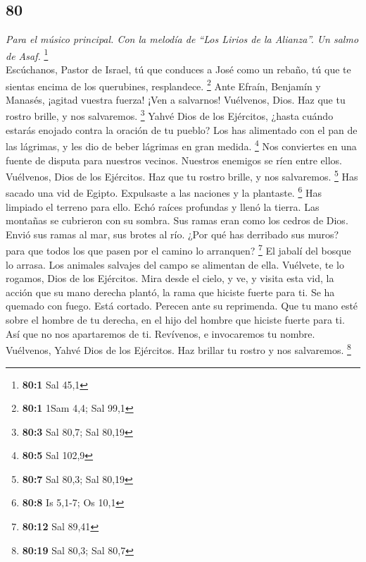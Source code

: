 \begin{paracol}{2}
\hypertarget{section-158}{%
\section{80}\label{section-158}}

\emph{Para el músico principal. Con la melodía de ``Los Lirios de la
Alianza''. Un salmo de Asaf.} \footnote{\textbf{80:1} Sal 45,1}\\
 Escúchanos, Pastor de Israel, tú que conduces a José como
un rebaño, tú que te sientas encima de los querubines, resplandece.
\footnote{\textbf{80:1} 1Sam 4,4; Sal 99,1}  Ante Efraín,
Benjamín y Manasés, ¡agitad vuestra fuerza! ¡Ven a salvarnos!
 Vuélvenos, Dios. Haz que tu rostro brille, y nos
salvaremos. \footnote{\textbf{80:3} Sal 80,7; Sal 80,19} 
Yahvé Dios de los Ejércitos, ¿hasta cuándo estarás enojado contra la
oración de tu pueblo?  Los has alimentado con el pan de
las lágrimas, y les dio de beber lágrimas en gran medida. \footnote{\textbf{80:5}
  Sal 102,9}  Nos conviertes en una fuente de disputa para
nuestros vecinos. Nuestros enemigos se ríen entre ellos. 
Vuélvenos, Dios de los Ejércitos. Haz que tu rostro brille, y nos
salvaremos. \footnote{\textbf{80:7} Sal 80,3; Sal 80,19} 
Has sacado una vid de Egipto. Expulsaste a las naciones y la plantaste.
\footnote{\textbf{80:8} Is 5,1-7; Os 10,1}  Has limpiado
el terreno para ello. Echó raíces profundas y llenó la tierra.
 Las montañas se cubrieron con su sombra. Sus ramas eran
como los cedros de Dios.  Envió sus ramas al mar, sus
brotes al río.  ¿Por qué has derribado sus muros? para
que todos los que pasen por el camino lo arranquen? \footnote{\textbf{80:12}
  Sal 89,41}  El jabalí del bosque lo arrasa. Los
animales salvajes del campo se alimentan de ella. 
Vuélvete, te lo rogamos, Dios de los Ejércitos. Mira desde el cielo, y
ve, y visita esta vid,  la acción que su mano derecha
plantó, la rama que hiciste fuerte para ti.  Se ha
quemado con fuego. Está cortado. Perecen ante su reprimenda.
 Que tu mano esté sobre el hombre de tu derecha, en el
hijo del hombre que hiciste fuerte para ti.  Así que no
nos apartaremos de ti. Revívenos, e invocaremos tu nombre.
 Vuélvenos, Yahvé Dios de los Ejércitos. Haz brillar tu
rostro y nos salvaremos. \footnote{\textbf{80:19} Sal 80,3; Sal 80,7}


\end{paracol}
